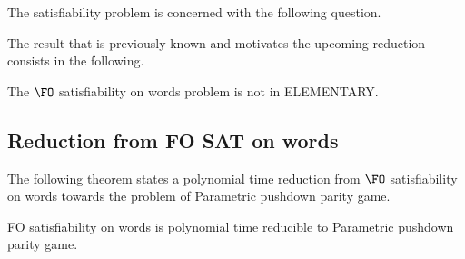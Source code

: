 \documentclass[a4paper,UKenglish,cleveref, autoref, thm-restate]{lipics-v2021}
\newcommand{\problemx}[3]{
	\vspace{0.2cm}
\par\noindent\underline{\sc#1}\par\nobreak\vskip.2\baselineskip
\begingroup\clubpenalty10000\widowpenalty10000
\setbox0\hbox{\bf INPUT:\ }\setbox1\hbox{\bf QUESTION:\ }
\dimen0=\wd0\ifnum\wd1>\dimen0\dimen0=\wd1\fi
\vskip-\parskip\noindent
\hbox to\dimen0{\box0\hfil}\hangindent\dimen0\hangafter1\ignorespaces#2\par
\vskip-\parskip\noindent
\hbox to\dimen0{\box1\hfil}\hangindent\dimen0\hangafter1\ignorespaces#3\par
\endgroup
	\vspace{-0.2cm}
}
\begin{document}
The satisfiability problem is concerned with the following question.



The result that is previously known and motivates the upcoming reduction consists in the following.


\begin{theorem}\label{FOnonelementary}
The {\sc $\FO$ satisfiability on words} problem is not in {\sc ELEMENTARY}.
\end{theorem}





\subsection{Reduction from FO SAT on words}

The following theorem states a polynomial time reduction from
{\sc $\FO$ satisfiability on words}
towards the problem of 
{\sc Parametric pushdown parity game}.




\begin{samepage}
\begin{theorem}
{\sc FO satisfiability on words} is polynomial time reducible to {\sc Parametric pushdown parity game}.
\end{theorem}
\end{samepage}
\end{document}
